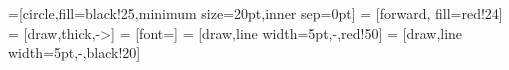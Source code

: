 =[circle,fill=black!25,minimum size=20pt,inner sep=0pt]
 = [forward, fill=red!24]
 = [draw,thick,->]
 = [font=\small]
 = [draw,line width=5pt,-,red!50]
 = [draw,line width=5pt,-,black!20]
